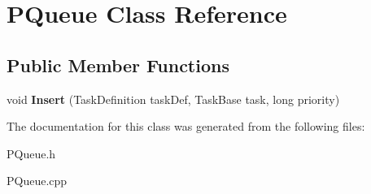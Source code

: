 \hypertarget{class_p_queue}{}\section{P\+Queue Class Reference}
\label{class_p_queue}
\subsection*{Public Member Functions}
\begin{DoxyCompactItemize}
\item 
\hypertarget{class_p_queue_a3987253271078091d1986ca05a3164e4}{}void {\bfseries Insert} (Task\+Definition task\+Def, Task\+Base task, long priority)\label{class_p_queue_a3987253271078091d1986ca05a3164e4}

\end{DoxyCompactItemize}


The documentation for this class was generated from the following files\+:\begin{DoxyCompactItemize}
\item 
P\+Queue.\+h\item 
P\+Queue.\+cpp\end{DoxyCompactItemize}
